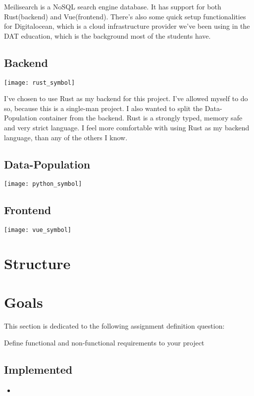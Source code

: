 \documentclass[a4paper, 12pt]{article}
\begin{document}
Meilisearch is a NoSQL search engine database. It has support for both Rust(backend) and Vue(frontend). There's also some quick setup functionalities for Digitalocean, which is a cloud infrastructure provider we've been using in the DAT education, which is the background most of the students have.   

\subsection{Backend}
\texttt{[image: rust\_symbol]}

I've chosen to use Rust as my backend for this project. I've allowed myself to do so, because this is a single-man project. I also wanted to split the Data-Population container from the backend. Rust is a strongly typed, memory safe and very strict language. I feel more comfortable with using Rust as my backend language, than any of the others I know. 

\subsection{Data-Population}
\texttt{[image: python\_symbol]}



\subsection{Frontend}
\texttt{[image: vue\_symbol]}

\section{Structure}


\section{Goals}
This section is dedicated to the following assignment definition question:

Define functional and non-functional requirements to your project

\subsection{Implemented}
\begin{itemize}
	\item
\end{itemize}
\end{document}
